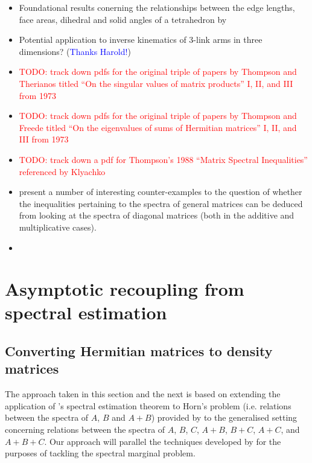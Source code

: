 \documentclass[notitlepage]{article}
\begin{document}
\begin{itemize}
    \item Foundational results conerning the relationships between the edge lengths, face areas, dihedral and solid angles of a tetrahedron by \citeauthor{richardson1902trigonometry} \cite{richardson1902trigonometry}
    \item Potential application to inverse kinematics of $3$-link arms in three dimensions? (\textcolor{blue}{Thanks Harold!})
    \item \textcolor{red}{TODO: track down pdfs for the original triple of papers by Thompson and Therianos titled ``On the singular values of matrix products'' I, II, and III from 1973}
    \item \textcolor{red}{TODO: track down pdfs for the original triple of papers by Thompson and Freede titled ``On the eigenvalues of sums of Hermitian matrices'' I, II, and III from 1973}
    \item \textcolor{red}{TODO: track down a pdf for Thompson's 1988 ``Matrix Spectral Inequalities'' referenced by Klyachko}
    \item {} \cite{thompson1973eigenvalues} present a number of interesting counter-examples to the question of whether the inequalities pertaining to the spectra of general matrices can be deduced from looking at the spectra of diagonal matrices (both in the additive and multiplicative cases).
    \item \cite{barrett2003geometrical}
\end{itemize}

\clearpage

\section{Asymptotic recoupling from spectral estimation}

\subsection{Converting Hermitian matrices to density matrices}

The approach taken in this section and the next is based on extending the application of \citeauthor{keyl2001estimating}'s spectral estimation theorem \cite{keyl2001estimating} to Horn's problem (i.e. relations between the spectra of $A$, $B$ and $A+B$) provided by \citeauthor{christandl2008quantum} \cite{christandl2008quantum} to the generalised setting concerning relations between the spectra of $A$, $B$, $C$, $A+B$, $B+C$, $A+C$, and $A+B+C$.
Our approach will parallel the techniques developed by \citeauthor{christandl2018recoupling} \cite{christandl2018recoupling} for the purposes of tackling the spectral marginal problem.
\end{document}
